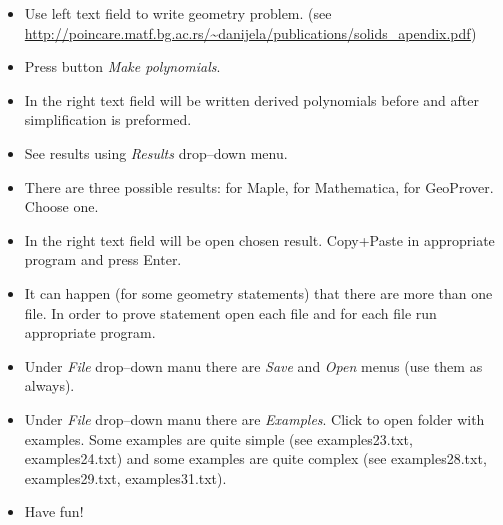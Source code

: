 \documentclass{article}
\begin{document}
\begin{itemize}
\item Use left text field to write geometry problem. (see
  \url{http://poincare.matf.bg.ac.rs/~danijela/publications/solids_apendix.pdf})

\item Press button {\em Make polynomials}.

\item In the right text field will be written derived polynomials
  before and after simplification is preformed.

\item See results using {\em Results} drop--down menu.

\item There are three possible results: for Maple, for Mathematica,
  for GeoProver. Choose one.

\item In the right text field will be open chosen result. Copy+Paste
  in appropriate program and press Enter. 

\item It can happen (for some geometry statements) that there are more
  than one file. In order to prove statement open each file and for
  each file run appropriate program.

\item Under {\em File} drop--down manu there are {\em Save} and {\em
  Open} menus (use them as always).

\item Under {\em File} drop--down manu there are {\em Examples}. Click
  to open folder with examples. Some examples are quite simple (see
  examples23.txt, examples24.txt) and some examples are quite complex
  (see examples28.txt, examples29.txt, examples31.txt).

\item Have fun! 

\end{itemize}
\end{document}

